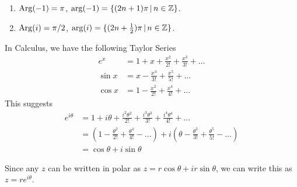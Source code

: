 \documentclass{article}
\begin{document}
	\begin{eg} $ $
		\begin{enumerate}[label=\alph*.)]
			\item $\operatorname{Arg}(-1) = \pi$, $\arg(-1) = \{ (2n+1)\pi \, | \, n \in \mathbb{Z} \}$.
			\item $\operatorname{Arg}(i) = \pi/2$, $\arg(i) = \{ (2n+\frac{1}{2})\pi \, | \, n \in \mathbb{Z} \}$.
		\end{enumerate}
	\end{eg}

	In Calculus, we have the following Taylor Series
	\begin{align*}
		e^x &= 1 + x + \frac{x^2}{2!} + \frac{x^3}{3!} + \dots \\
		\sin x &= x - \frac{x^3}{3!} + \frac{x^5}{5!} + \dots \\
		\cos x &= 1 - \frac{x^2}{2!} + \frac{x^4}{4!} + \dots
	\end{align*}
	This suggests
	\begin{align*}
		e^{i\theta} &= 1 + i\theta + \frac{i^2\theta^2}{2!} + \frac{i^3\theta^3}{3!} + \frac{i^4\theta^4}{4!} + \dots \\
		&= \left( 1 - \frac{\theta^2}{2!} + \frac{\theta^4}{4!} - \dots \right) + i\left( \theta - \frac{\theta^3}{3!} + \frac{\theta^5}{5!} - \dots \right) \\
		&= \cos\theta + i\sin\theta
	\end{align*}

	Since any $z$ can be written in polar as $z=r\cos\theta + ir\sin\theta$, we can write this as $z=re^{i\theta}$.
\end{document}
